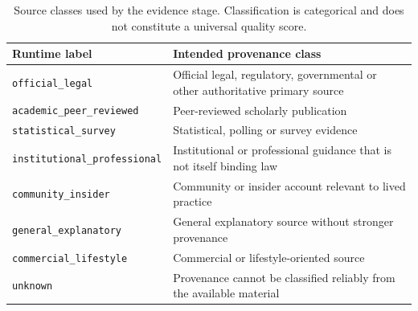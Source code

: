 \begin{table}[htbp]
\centering
\footnotesize
\setlength{\tabcolsep}{4pt}
\renewcommand{\arraystretch}{1.08}
\caption{Source classes used by the evidence stage. Classification is categorical and does not constitute a universal quality score.}
\label{tab:source-types}
\begin{tabularx}{\textwidth}{p{3.5cm}X}
\toprule
\textbf{Runtime label} & \textbf{Intended provenance class} \\
\midrule
\nolinkurl{official_legal} & Official legal, regulatory, governmental or other authoritative primary source \\
\nolinkurl{academic_peer_reviewed} & Peer-reviewed scholarly publication \\
\nolinkurl{statistical_survey} & Statistical, polling or survey evidence \\
\nolinkurl{institutional_professional} & Institutional or professional guidance that is not itself binding law \\
\nolinkurl{community_insider} & Community or insider account relevant to lived practice \\
\nolinkurl{general_explanatory} & General explanatory source without stronger provenance \\
\nolinkurl{commercial_lifestyle} & Commercial or lifestyle-oriented source \\
\nolinkurl{unknown} & Provenance cannot be classified reliably from the available material \\
\bottomrule
\end{tabularx}
\end{table}
